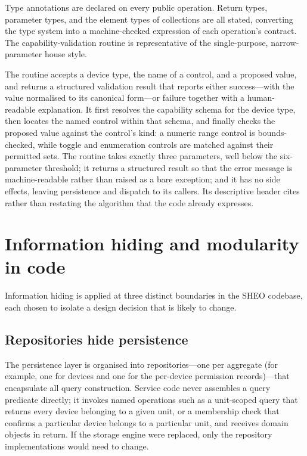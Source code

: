 Type annotations are declared on every public operation. Return types,
parameter types, and the element types of collections are all stated, converting the
type system into a machine-checked expression of each operation's contract. The
capability-validation routine is representative of the single-purpose, narrow-parameter
house style.

\label{lst:validate}%
The routine accepts a device type, the name of a control, and a proposed value, and
returns a structured validation result that reports either success---with the value
normalised to its canonical form---or failure together with a human-readable
explanation. It first resolves the capability schema for the device type, then locates
the named control within that schema, and finally checks the proposed value against the
control's kind: a numeric range control is bounds-checked, while toggle and enumeration
controls are matched against their permitted sets. The routine takes exactly three
parameters, well below the six-parameter threshold; it returns a structured result so
that the error message is machine-readable rather than raised as a bare exception; and
it has no side effects, leaving persistence and dispatch to its callers. Its descriptive
header cites  rather than restating the algorithm that the code already
expresses.

\section{Information hiding and modularity in code}
\label{sec:info-hiding}

Information hiding is applied at three distinct boundaries in the SHEO codebase, each
chosen to isolate a design decision that is likely to change.

\subsection{Repositories hide persistence}

The persistence layer is organised into repositories---one per aggregate (for example,
one for devices and one for the per-device permission records)---that encapsulate all
query construction. Service code
never assembles a query predicate directly; it invokes named operations such as a
unit-scoped query that returns every device belonging to a given unit, or a membership
check that confirms a particular device belongs to a particular unit, and receives
domain objects in return. If the storage engine were replaced, only the repository
implementations would need to change.

